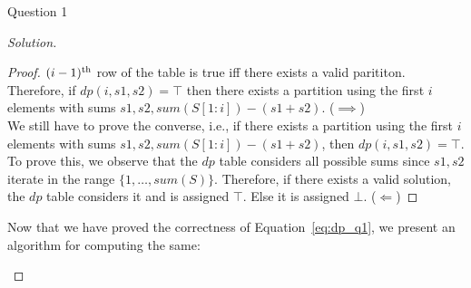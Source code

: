 \begin{solution}{Question 1}
\begin{proof}[Solution]
\begin{proof}
            $(i-1)\textsuperscript{th}$ row of the table is true iff there exists a valid parititon. Therefore, if $dp(i, s1, s2)=\top$ then there exists a partition using the first $i$ elements with sums $s1, s2, sum(S[1:i])-(s1+s2)$. ($\implies$)\\

            We still have to prove the converse, i.e., if there exists a partition using the first $i$ elements with sums $s1, s2, sum(S[1:i])-(s1+s2)$, then $dp(i, s1, s2)=\top$.\\
            To prove this, we observe that the $dp$ table considers all possible sums since $s1, s2$ iterate in the range $\{1, \ldots, sum(S)\}$. Therefore, if there exists a valid solution, the $dp$ table considers it and is assigned $\top$. Else it is assigned $\bot$. ($\Longleftarrow$)
        \end{proof}
        Now that we have proved the correctness of Equation~\ref{eq:dp_q1}, we present an algorithm for computing the same:
        \begin{algorithm}[H]
            \caption{DP solution for partitioning}\label{alg:dp_q1}
            \begin{algorithmic}[1]
                                \EndIf{}
                                \EndIf{}
                            \EndFor{}
                        \EndFor{}
                    \EndFor{}
            \end{algorithmic}
        \end{algorithm}
        \begin{algorithm}[H]
            \begin{algorithmic}[1]

\end{algorithmic}
\end{algorithm}
\end{proof}
\end{solution}

